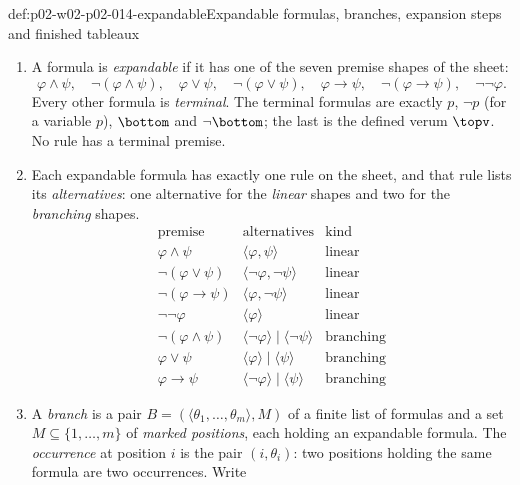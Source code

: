 \begin{hbdefinition}{def:p02-w02-p02-014-expandable}{Expandable formulas, branches, expansion steps and finished tableaux}
\begin{enumerate}
  \item A formula is \emph{expandable} if it has one of the seven premise
        shapes of the sheet:
        \[
          \varphi\land\psi,\quad \neg(\varphi\land\psi),\quad
          \varphi\lor\psi,\quad \neg(\varphi\lor\psi),\quad
          \varphi\to\psi,\quad \neg(\varphi\to\psi),\quad
          \neg\neg\varphi .
        \]
        Every other formula is \emph{terminal}.  The terminal formulas are
        exactly \(p\), \(\neg p\) (for a variable \(p\)), \(\bottom\) and
        \(\neg\bottom\); the last is the defined verum \(\topv\).  No rule
        has a terminal premise.
  \item Each expandable formula has exactly one rule on the sheet, and that
        rule lists its \emph{alternatives}: one alternative for the
        \emph{linear} shapes and two for the \emph{branching} shapes.
        \[
        \begin{array}{lll}
          \text{premise} & \text{alternatives} & \text{kind}\\ \hline
          \varphi\land\psi & \langle\varphi,\psi\rangle & \text{linear}\\
          \neg(\varphi\lor\psi) & \langle\neg\varphi,\neg\psi\rangle & \text{linear}\\
          \neg(\varphi\to\psi) & \langle\varphi,\neg\psi\rangle & \text{linear}\\
          \neg\neg\varphi & \langle\varphi\rangle & \text{linear}\\
          \neg(\varphi\land\psi) & \langle\neg\varphi\rangle\mid\langle\neg\psi\rangle & \text{branching}\\
          \varphi\lor\psi & \langle\varphi\rangle\mid\langle\psi\rangle & \text{branching}\\
          \varphi\to\psi & \langle\neg\varphi\rangle\mid\langle\psi\rangle & \text{branching}
        \end{array}
        \]
  \item A \emph{branch} is a pair \(B=(\langle\theta_1,\ldots,\theta_m\rangle,M)\)
        of a finite list of formulas and a set \(M\subseteq\{1,\ldots,m\}\)
        of \emph{marked positions}, each holding an expandable formula.  The
        \emph{occurrence} at position \(i\) is the pair \((i,\theta_i)\): two
        positions holding the same formula are two occurrences.  Write

\end{enumerate}
\end{hbdefinition}
